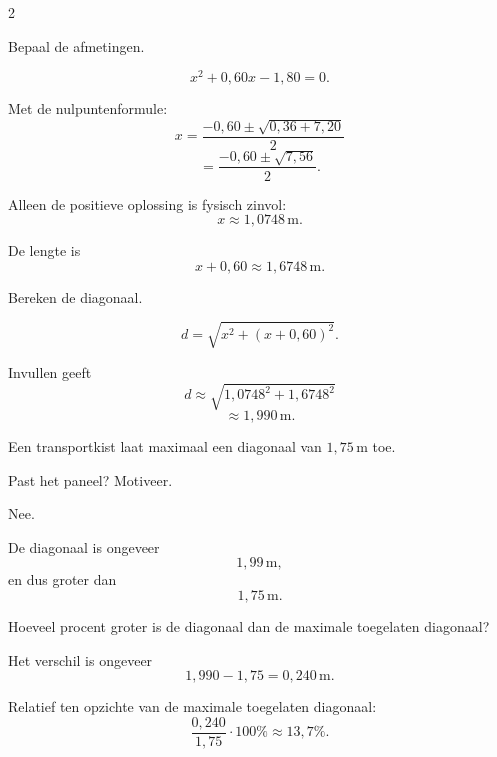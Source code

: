 \documentclass{ximera}
\begin{document}
\begin{oefening}{\oefG}
\begin{multicols}{2}
    
    \begin{question}
    Bepaal de afmetingen.
    
    \begin{oplossing}
    \[
    x^2+0{,}60x-1{,}80=0.
    \]
    
    Met de nulpuntenformule:
    \[
    x=
    \frac{-0{,}60\pm\sqrt{0{,}36+7{,}20}}{2}
    \]
    \[
    =
    \frac{-0{,}60\pm\sqrt{7{,}56}}{2}.
    \]
    
    Alleen de positieve oplossing is fysisch zinvol:
    \[
    x\approx1{,}0748\,\mathrm m.
    \]
    
    De lengte is
    \[
    x+0{,}60
    \approx1{,}6748\,\mathrm m.
    \]
    \end{oplossing}
    \end{question}
    
    
    \begin{question}
    Bereken de diagonaal.
    
    \begin{oplossing}
    \[
    d
    =
    \sqrt{x^2+(x+0{,}60)^2}.
    \]
    
    Invullen geeft
    \[
    d
    \approx
    \sqrt{1{,}0748^2+1{,}6748^2}
    \]
    \[
    \approx1{,}990\,\mathrm m.
    \]
    \end{oplossing}
    \end{question}
    
    
    \begin{question}
    Een transportkist laat maximaal een diagonaal van
    $1{,}75\,\mathrm m$ toe.
    
    Past het paneel? Motiveer.
    
    \begin{oplossing}
    Nee.
    
    De diagonaal is ongeveer
    \[
    1{,}99\,\mathrm m,
    \]
    en dus groter dan
    \[
    1{,}75\,\mathrm m.
    \]
    \end{oplossing}
    \end{question}
    
    
    \begin{question}
    Hoeveel procent groter is de diagonaal dan de maximale toegelaten diagonaal?
    
    \begin{oplossing}
    Het verschil is ongeveer
    \[
    1{,}990-1{,}75
    =0{,}240\,\mathrm m.
    \]
    
    Relatief ten opzichte van de maximale toegelaten diagonaal:
    \[
    \frac{0{,}240}{1{,}75}\cdot100\%
    \approx13{,}7\%.
    \]
    

\end{oplossing}
\end{question}
\end{multicols}
\end{oefening}
\end{document}
